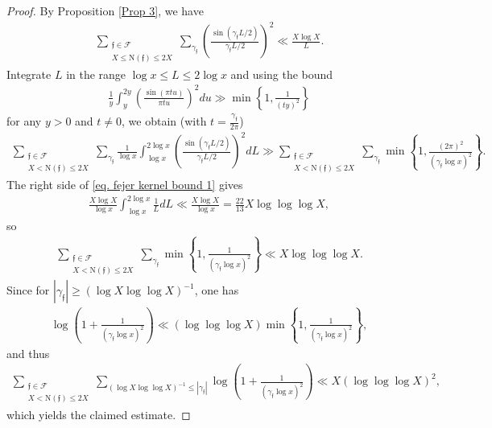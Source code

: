\documentclass[11pt]{amsart}
\newcommand{\X}{X}
\newcommand{\norm}{\mathrm{N}}
\numberwithin{equation}{section}
\theoremstyle{remark}
\begin{document}
\begin{proof}
    By Proposition \ref{Prop 3}, we have 
    \begin{align}\label{eq. fejer kernel bound 1}
        \sum_{\substack{\mathfrak{f}\in \mathcal{F}\\X\le \norm(\mathfrak{f})\le 2X}} \sum_{\gamma_\mathfrak{f}}\left( \frac{\sin(\gamma_\mathfrak{f}L/2)}{\gamma_\mathfrak{f}L/2}\right)^2
        \ll
        \frac{X\log X}{L}.
    \end{align}
    Integrate $L$ in the range $\log x \le L \le 2\log x$ and using the bound
    \begin{align*}
        \frac{1}{y}\int_y^{2y} \left( \frac{\sin(\pi tu)}{\pi tu} \right)^2 du \gg
        \min\left\{ 1, \frac{1}{(ty)^2} \right\}
    \end{align*}
    for any $y>0$ and $t\ne 0$, we obtain (with $ t=\frac{\gamma_\mathfrak{f}}{2\pi}$)
    \begin{align*}
        \sum_{\substack{\mathfrak{f}\in \mathcal{F}\\X< \norm(\mathfrak{f})\le 2X}} \sum_{\gamma_\mathfrak{f}}
        \frac{1}{\log x} \int_{\log x}^{2\log x}
        \left( \frac{\sin(\gamma_\mathfrak{f}L/2)}{\gamma_\mathfrak{f}L/2}\right)^2 dL
        \gg
        \sum_{\substack{\mathfrak{f}\in \mathcal{F}\\X< \norm(\mathfrak{f})\le 2X}} \sum_{\gamma_\mathfrak{f}}
        \min\left\{ 1, \frac{(2\pi)^2}{(\gamma_\mathfrak{f}\log x)^2} \right\}.
    \end{align*} 
    The right side of \eqref{eq. fejer kernel bound 1} gives
    \begin{align*}
        \frac{X\log X}{\log x}\int_{\log x}^{2\log x}\frac{1}{L}dL
        \ll
        \frac{X\log X}{\log x}=\frac{22}{13}{X \log \log \log X},
    \end{align*}
    so
    \begin{align*}
        \sum_{\substack{\mathfrak{f}\in \mathcal{F}\\X< \norm(\mathfrak{f})\le 2X}} \sum_{\gamma_\mathfrak{f}}
        \min\left\{ 1, \frac{1}{(\gamma_\mathfrak{f}\log x)^2} \right\}
        \ll
        X\log \log \log X.
    \end{align*}
    Since for $|\gamma_\mathfrak{f}|\ge (\log X\log \log X)^{-1}$, one has
    \begin{align*}
        \log \left( 1+\frac{1}{(\gamma_\mathfrak{f} \log x)^2} \right)
        \ll
        (\log \log \log X) \min\left\{ 1, \frac{1}{(\gamma_\mathfrak{f}\log x)^2} \right\},
    \end{align*}
and thus
    \begin{align*}
        \sum_{\substack{\mathfrak{f}\in \mathcal{F}\\X<\norm(\mathfrak{f})\le 2X}}
        \sum_{(\log X\log \log X)^{-1}\le |\gamma_\mathfrak{f}|}
        \log\left( 1+\frac{1}{(\gamma_\mathfrak{f} \log x)^2} \right)
        \ll 
        X(\log \log \log X)^2,
    \end{align*}
which yields the claimed estimate.
\end{proof}
\end{document}
